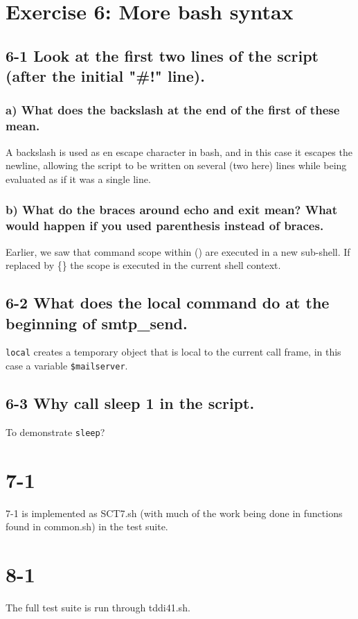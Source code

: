 \section{Exercise 6: More bash syntax}
\subsection{6-1 Look at the first two lines of the script (after the initial "\#!" line).}

\subsubsection{a) What does the backslash at the end of the first of these mean.}
A backslash is used as en escape character in bash, and in this case it escapes the newline, allowing the script to be written on several (two here) lines while being evaluated as if it was a single line.

\subsubsection{b) What do the braces around echo and exit mean? What would happen if you used parenthesis instead of braces.}
Earlier, we saw that command scope within () are executed in a new sub-shell. If replaced by \{\} the scope is executed in the current shell context.

\subsection{6-2 What does the local command do at the beginning of smtp\_send.}
\verb=local= creates a temporary object that is local to the current call frame, in this case a variable \verb=$mailserver=.

\subsection{6-3 Why call sleep 1 in the script.}
To demonstrate \verb=sleep=?

\section{7-1}
7-1 is implemented as SCT7.sh (with much of the work being done in functions found in common.sh) in the test suite.

\section{8-1}
The full test suite is run through tddi41.sh.

